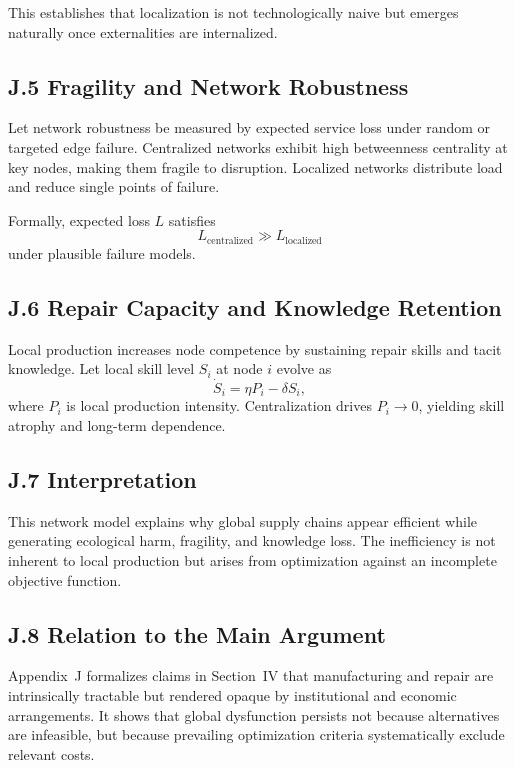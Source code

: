 \documentclass[11pt]{article}
\begin{document}
This establishes that localization is not technologically naive but emerges naturally once externalities are internalized.

\subsection{J.5 Fragility and Network Robustness}

Let network robustness be measured by expected service loss under random or targeted edge failure. Centralized networks exhibit high betweenness centrality at key nodes, making them fragile to disruption. Localized networks distribute load and reduce single points of failure.

Formally, expected loss \(L\) satisfies
\[
L_{\text{centralized}} \gg L_{\text{localized}}
\]
under plausible failure models.

\subsection{J.6 Repair Capacity and Knowledge Retention}

Local production increases node competence by sustaining repair skills and tacit knowledge. Let local skill level \(S_i\) at node \(i\) evolve as
\[
\dot{S}_i = \eta P_i - \delta S_i,
\]
where \(P_i\) is local production intensity. Centralization drives \(P_i \to 0\), yielding skill atrophy and long-term dependence.

\subsection{J.7 Interpretation}

This network model explains why global supply chains appear efficient while generating ecological harm, fragility, and knowledge loss. The inefficiency is not inherent to local production but arises from optimization against an incomplete objective function.

\subsection{J.8 Relation to the Main Argument}

Appendix~J formalizes claims in Section~IV that manufacturing and repair are intrinsically tractable but rendered opaque by institutional and economic arrangements. It shows that global dysfunction persists not because alternatives are infeasible, but because prevailing optimization criteria systematically exclude relevant costs.
\end{document}
